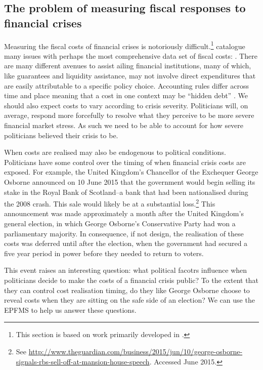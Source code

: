 \documentclass[]{article}
\begin{document}
\subsection{The problem of measuring fiscal responses to financial crises}

Measuring the fiscal costs of financial crises is notoriously difficult.\footnote{This section is based on work primarily developed in \cite{gandrudHallerbergPBC}.} \cite{GandrudHallerberg2015} catalogue many issues with perhaps the most comprehensive data set of fiscal costs: \cite[and their predecessors]{laeven2013}. There are many different avenues to assist ailing financial institutions, many of which, like guarantees and liquidity assistance, may not involve direct expenditures that are easily attributable to a specific policy choice. Accounting rules differ across time and place \citep{gandrudHallerbergWEP} meaning that a cost in one context may be ``hidden debt'' \citep{reinhartRogoff2011}. We should also expect costs to vary according to crisis severity. Politicians will, on average, respond more forcefully to resolve what they perceive to be more severe financial market stress. As such we need to be able to account for how severe politicians believed their crisis to be.

When costs are realised may also be endogenous to political conditions. Politicians have some control over the timing of when financial crisis costs are exposed. For example, the United Kingdom's Chancellor of the Exchequer George Osborne announced on 10 June 2015 that the government would begin selling its stake in the Royal Bank of Scotland--a bank that had been nationalised during the 2008 crash. This sale would likely be at a substantial loss.\footnote{See \url{http://www.theguardian.com/business/2015/jun/10/george-osborne-signals-rbs-sell-off-at-mansion-house-speech}. Accessed June 2015.} This announcement was made approximately a month after the United Kingdom's general election, in which George Osborne's Conservative Party had won a parliamentary majority. In consequence, if not design, the realisation of these costs was deferred until after the election, when the government had secured a five year period in power before they needed to return to voters.

This event raises an interesting question: what political facotrs influence when politicians decide to make the costs of a financial crisis public? To the extent that they can control cost realisation timing, do they like George Osborne choose to reveal costs when they are sitting on the safe side of an election? We can use the EPFMS to help us answer these questions.
\end{document}
